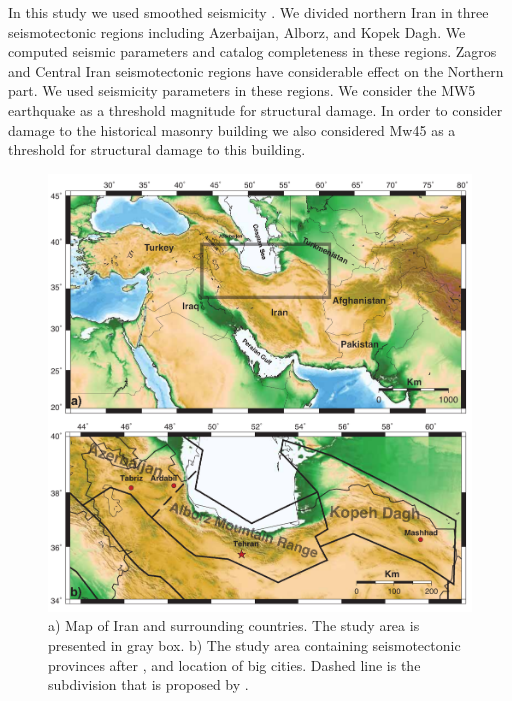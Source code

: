 In this study we used smoothed seismicity \citep{Frankel1995}. We divided northern Iran in three seismotectonic regions including Azerbaijan, Alborz, and Kopek Dagh. We computed seismic parameters and catalog completeness in these regions. Zagros and Central Iran seismotectonic regions have considerable effect on the Northern part. We used \citet{Karimiparidari2013} seismicity parameters in these regions.  We consider the MW5 earthquake as a threshold magnitude  for structural damage. In order to consider damage to the historical masonry building we also considered Mw45 as a threshold for structural damage to this building. 


\begin{figure} [H]
\centering
\includegraphics[scale=0.7]{figures/pdf/Figure1.pdf} 
\caption{ a) Map of Iran and surrounding countries. The study area is presented in gray box. b) The study area containing seismotectonic provinces after \citet{Mirzaei1998}, and location of big cities. Dashed line is the subdivision that is proposed by \citet{Karimiparidari2013}. }
 
\label{fig:Iran}
\end{figure}





